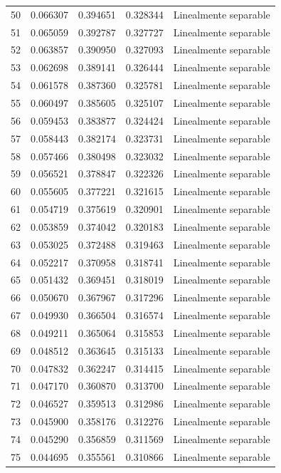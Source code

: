 \begin{tabular}{lllll}
50 & 0.066307 & 0.394651 & 0.328344 & Linealmente separable \\
51 & 0.065059 & 0.392787 & 0.327727 & Linealmente separable \\
52 & 0.063857 & 0.390950 & 0.327093 & Linealmente separable \\
53 & 0.062698 & 0.389141 & 0.326444 & Linealmente separable \\
54 & 0.061578 & 0.387360 & 0.325781 & Linealmente separable \\
55 & 0.060497 & 0.385605 & 0.325107 & Linealmente separable \\
56 & 0.059453 & 0.383877 & 0.324424 & Linealmente separable \\
57 & 0.058443 & 0.382174 & 0.323731 & Linealmente separable \\
58 & 0.057466 & 0.380498 & 0.323032 & Linealmente separable \\
59 & 0.056521 & 0.378847 & 0.322326 & Linealmente separable \\
60 & 0.055605 & 0.377221 & 0.321615 & Linealmente separable \\
61 & 0.054719 & 0.375619 & 0.320901 & Linealmente separable \\
62 & 0.053859 & 0.374042 & 0.320183 & Linealmente separable \\
63 & 0.053025 & 0.372488 & 0.319463 & Linealmente separable \\
64 & 0.052217 & 0.370958 & 0.318741 & Linealmente separable \\
65 & 0.051432 & 0.369451 & 0.318019 & Linealmente separable \\
66 & 0.050670 & 0.367967 & 0.317296 & Linealmente separable \\
67 & 0.049930 & 0.366504 & 0.316574 & Linealmente separable \\
68 & 0.049211 & 0.365064 & 0.315853 & Linealmente separable \\
69 & 0.048512 & 0.363645 & 0.315133 & Linealmente separable \\
70 & 0.047832 & 0.362247 & 0.314415 & Linealmente separable \\
71 & 0.047170 & 0.360870 & 0.313700 & Linealmente separable \\
72 & 0.046527 & 0.359513 & 0.312986 & Linealmente separable \\
73 & 0.045900 & 0.358176 & 0.312276 & Linealmente separable \\
74 & 0.045290 & 0.356859 & 0.311569 & Linealmente separable \\
75 & 0.044695 & 0.355561 & 0.310866 & Linealmente separable \\

\end{tabular}
